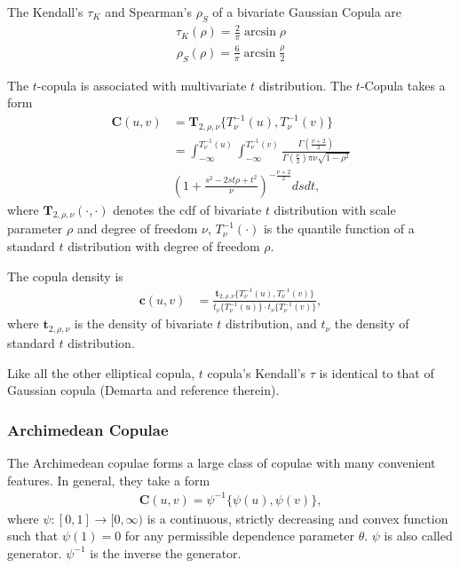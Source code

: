 The Kendall's $\tau_K$ and Spearman's $\rho_S$ of a bivariate Gaussian Copula are
    \begin{align}
        \tau_K(\rho) = \frac{2}{\pi}\arcsin\rho
        \end{align}
    \begin{align}
        \rho_S(\rho) = \frac{6}{\pi}\arcsin\frac{\rho}{2}
        \end{align}\medskip

The $t$-copula is associated with multivariate $t$ distribution.
The $t$-Copula takes a form
\begin{align}
        \bm{C}(u,v) &= \bm{T}_{2, \rho, \nu}\{T^{-1}_\nu(u), T^{-1}_\nu(v)\} \nonumber \\
            &= \int_{-\infty}^{T^{-1}_\nu(u)}
               \int_{-\infty}^{T^{-1}_\nu(v)}
            \frac{\Gamma\left(\frac{\nu+2}{2}\right)}
            {\Gamma\left(\frac{\nu}{2}\right)\pi\nu\sqrt{1-\rho^2}}\\
           & \left(
        1+\frac{s^2-2st\rho+t^2}{\nu}
        \right)^{-\frac{\nu+2}{2}} ds dt,
    \end{align}
where $\bm{T}_{2, \rho, \nu}(\cdot, \cdot)$ denotes the cdf of bivariate $t$ distribution with scale parameter $\rho$ and degree of freedom $\nu$,
$T^{-1}_\nu(\cdot)$ is the quantile function of a standard $t$ distribution with degree of freedom $\rho$.

The copula density is
\begin{align}
    \bm{c}(u,v) &= \frac{\bm{t}_{2, \rho, \nu}\{T^{-1}_\nu(u), T^{-1}_\nu(v)\}}
    {t_\nu\{T^{-1}_\nu(u)\}\cdot t_\nu\{T^{-1}_\nu(v)\}},
    \end{align}
where $\bm{t}_{2,\rho, \nu}$ is the density of bivariate $t$ distribution,
and $t_\nu$ the density of standard $t$ distribution.\medskip

Like all the other elliptical copula, $t$ copula's Kendall's $\tau$ is identical to that of Gaussian copula (Demarta and reference therein).

\subsubsection{Archimedean Copulae}\label{sec:archimedean-copula}
The Archimedean copulae forms a large class of copulae with many convenient features.
In general, they take a form
\begin{align}
    \bm{C}(u,v)= \psi^{-1}\{\psi(u), \psi(v)\},
    \end{align}
where $\psi:[0,1] \rightarrow [0,\infty)$ is a continuous, strictly decreasing and convex function such that
$\psi(1)=0$ for any permissible dependence parameter $\theta$. $\psi$ is also called generator.
$\psi^{-1}$ is the inverse the generator.\medskip

